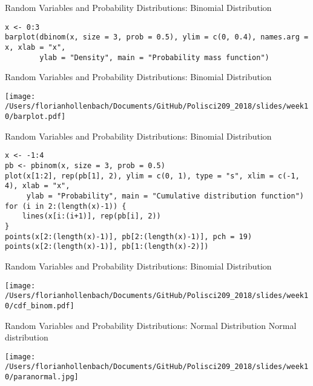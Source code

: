 \documentclass[presentation]{beamer}
\begin{document}
\begin{frame}[fragile,shrink=35,label={sec:orgdd823a0}]{Random Variables and Probability Distributions: Binomial Distribution}
 \begin{verbatim}
x <- 0:3
barplot(dbinom(x, size = 3, prob = 0.5), ylim = c(0, 0.4), names.arg = x, xlab = "x",
        ylab = "Density", main = "Probability mass function")
\end{verbatim}
\end{frame}




\begin{frame}[label={sec:orgc0df930}]{Random Variables and Probability Distributions: Binomial Distribution}
\begin{center}
\texttt{[image: /Users/florianhollenbach/Documents/GitHub/Polisci209\_2018/slides/week10/barplot.pdf]}
\end{center}
\end{frame}


\begin{frame}[fragile,shrink=35,label={sec:org9aec0f9}]{Random Variables and Probability Distributions: Binomial Distribution}
 \begin{verbatim}
x <- -1:4
pb <- pbinom(x, size = 3, prob = 0.5)
plot(x[1:2], rep(pb[1], 2), ylim = c(0, 1), type = "s", xlim = c(-1, 4), xlab = "x",
     ylab = "Probability", main = "Cumulative distribution function")
for (i in 2:(length(x)-1)) {
    lines(x[i:(i+1)], rep(pb[i], 2))
}
points(x[2:(length(x)-1)], pb[2:(length(x)-1)], pch = 19)
points(x[2:(length(x)-1)], pb[1:(length(x)-2)])
\end{verbatim}
\end{frame}




\begin{frame}[label={sec:org4a085c6}]{Random Variables and Probability Distributions: Binomial Distribution}
\begin{center}
\texttt{[image: /Users/florianhollenbach/Documents/GitHub/Polisci209\_2018/slides/week10/cdf\_binom.pdf]}
\end{center}
\end{frame}




\begin{frame}[label={sec:org2656b1b}]{Random Variables and Probability Distributions: Normal Distribution}
\alert{Normal distribution}

\begin{center}
\texttt{[image: /Users/florianhollenbach/Documents/GitHub/Polisci209\_2018/slides/week10/paranormal.jpg]}
\end{center}
\end{frame}
\end{document}
